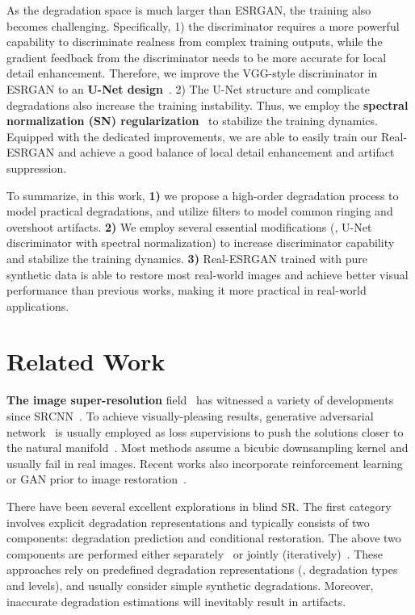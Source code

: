 \documentclass[10pt,twocolumn,letterpaper]{article}
\begin{document}
As the degradation space is much larger than ESRGAN, the training also becomes challenging. 
Specifically, 1) the discriminator requires a more powerful capability to discriminate realness from complex training outputs, while the gradient feedback from the discriminator needs to be more accurate for local detail enhancement.
Therefore, we improve the VGG-style discriminator in ESRGAN to an \textbf{U-Net design}~\cite{schonfeld2020u,yan2021fine,ronneberger2015u}.
2) The U-Net structure and complicate degradations also increase the training instability. Thus, we employ the \textbf{spectral normalization (SN) regularization}~\cite{miyato2018spectral,schonfeld2020u} to stabilize the training dynamics.
Equipped with the dedicated improvements, we are able to easily train our Real-ESRGAN and achieve a good balance of local detail enhancement and artifact suppression.

To summarize, in this work,
\textbf{1)} we propose a high-order degradation process to model practical degradations, and utilize  filters to model common ringing and overshoot artifacts.
\textbf{2)} We employ several essential modifications (\eg, U-Net discriminator with spectral normalization) to increase discriminator capability and stabilize the training dynamics.
\textbf{3)} Real-ESRGAN trained with pure synthetic data is able to restore most real-world images and achieve better visual performance than previous works, making it more practical in real-world applications.

 \section{Related Work}
\noindent\textbf{The image super-resolution} field~\cite{kim2016accurate,lai2017deep,timofte2017ntire,haris2018deep,ledig2017photo,lim2017enhanced,zhang2018residual,kim2016deeply,tai2017image,zhang2018rcan,dai2019second,liu2018non} has witnessed a variety of developments since SRCNN~\cite{dong2014learning,dong2016image}.
To achieve visually-pleasing results, generative adversarial network~\cite{goodfellow2014gan} is usually employed as loss supervisions to push the solutions closer to the natural manifold~\cite{ledig2017srgan,sajjadi2017enhancenet,wang2018esrgan,wang2018sftgan}.
Most methods assume a bicubic downsampling kernel and usually fail in real images.
Recent works also incorporate reinforcement learning or GAN prior to image restoration~\cite{yu2019path,chan2020glean,wang2021gfpgan}.

There have been several excellent explorations in blind SR. 
The first category involves explicit degradation representations and typically consists of two components: degradation prediction and conditional restoration.
The above two components are performed either separately~\cite{bell2019blind, zhang2018learning} or jointly (iteratively)~\cite{gu2019blind, luo2020unfolding, wang2021unsupervised}.
These approaches rely on predefined degradation representations (\eg, degradation types and levels), and usually consider simple synthetic degradations.
Moreover, inaccurate degradation estimations will inevitably result in artifacts.
\end{document}
